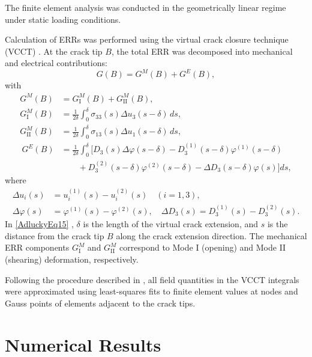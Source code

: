 The finite element analysis was conducted in the geometrically linear regime under static loading conditions.

Calculation of ERRs was performed using the virtual crack closure technique (VCCT) \cite{Adlucky32,Adlucky33,Adlucky34,Adlucky57,Adlucky61}. At the crack tip $B$, the total ERR was decomposed into mechanical and electrical contributions:
\begin{equation}
    G(B) = G^{M}(B) + G^{E}(B),
    \label{AdluckyEq14}
\end{equation}
with
\begin{equation}\label{AdluckyEq15}
	\begin{aligned}
		G^M(B) &= G^M_{\mathrm{I}}(B) + G^M_{\mathrm{II}}(B), 
		 \\
		G^M_{\mathrm{I}}(B) &= \frac{1}{2\delta} \int_0^{\delta} \sigma_{33}(s) \Delta u_3(s - \delta)\, ds,
		\\
		G^M_{\mathrm{II}}(B) &= \frac{1}{2\delta} \int_0^{\delta} \sigma_{13}(s) \Delta u_1(s - \delta)\, ds, \\\
		G^E(B) &= \frac{1}{2\delta} \int_0^{\delta} \big[
		D_3(s) \Delta \varphi(s - \delta)
		- D_3^{(1)}(s - \delta) \varphi^{(1)}(s - \delta)  \\
		&\qquad + D_3^{(2)}(s - \delta) \varphi^{(2)}(s - \delta)
		- \Delta D_3(s - \delta) \varphi(s)
		\big] ds,
	\end{aligned}
	\end{equation}
where
\begin{align*}
	\Delta u_i(s) &= u_i^{(1)}(s) - u_i^{(2)}(s) \quad (i = 1,3), \nonumber \\
	\Delta \varphi(s) &= \varphi^{(1)}(s) - \varphi^{(2)}(s), \quad
	\Delta D_3(s) = D_3^{(1)}(s) - D_3^{(2)}(s).
\end{align*}
In \eqref{AdluckyEq15} , $\delta$ is the length of the virtual crack extension, and $s$ is the distance from the crack tip $B$ along the crack extension direction. The mechanical ERR components $G^M_{\mathrm{I}}$ and $G^M_{\mathrm{II}}$ correspond to Mode I (opening) and Mode II (shearing) deformation, respectively.

Following the procedure described in \cite{Adlucky1,Adlucky2}, all field quantities in the VCCT integrals were approximated using least-squares fits to finite element values at nodes and Gauss points of elements adjacent to the crack tips.


\section{Numerical Results}

